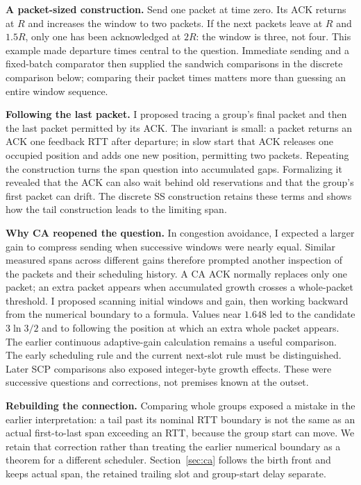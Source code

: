 \documentclass[sigconf,nonacm]{acmart}
\begin{document}
\textbf{A packet-sized construction.} Send one packet at time zero. Its ACK returns at $R$ and increases the window to two packets. If the next packets leave at $R$ and $1.5R$, only one has been acknowledged at $2R$: the window is three, not four. This example made departure times central to the question. Immediate sending and a fixed-batch comparator then supplied the sandwich comparisons in the discrete comparison below; comparing their packet times matters more than guessing an entire window sequence.

\textbf{Following the last packet.} I proposed tracing a group's final packet and then the last packet permitted by its ACK. The invariant is small: a packet returns an ACK one feedback RTT after departure; in slow start that ACK releases one occupied position and adds one new position, permitting two packets. Repeating the construction turns the span question into accumulated gaps. Formalizing it revealed that the ACK can also wait behind old reservations and that the group's first packet can drift. The discrete SS construction retains these terms and shows how the tail construction leads to the limiting span.

\textbf{Why CA reopened the question.} In congestion avoidance, I expected a larger gain to compress sending when successive windows were nearly equal. Similar measured spans across different gains therefore prompted another inspection of the packets and their scheduling history. A CA ACK normally replaces only one packet; an extra packet appears when accumulated growth crosses a whole-packet threshold. I proposed scanning initial windows and gain, then working backward from the numerical boundary to a formula. Values near $1.648$ led to the candidate $3\ln3/2$ and to following the position at which an extra whole packet appears. The earlier continuous adaptive-gain calculation remains a useful comparison. The early scheduling rule and the current next-slot rule must be distinguished. Later SCP comparisons also exposed integer-byte growth effects. These were successive questions and corrections, not premises known at the outset.

\textbf{Rebuilding the connection.} Comparing whole groups exposed a mistake in the earlier interpretation: a tail past its nominal RTT boundary is not the same as an actual first-to-last span exceeding an RTT, because the group start can move. We retain that correction rather than treating the earlier numerical boundary as a theorem for a different scheduler. Section~\ref{sec:ca} follows the birth front and keeps actual span, the retained trailing slot and group-start delay separate.
\end{document}
